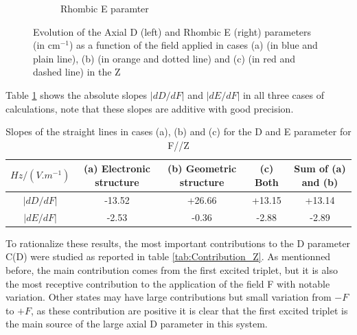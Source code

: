 \documentclass[10pt]{report}
\numberwithin{equation}{section}
\begin{document}
\begin{figure}[!h]
\begin{subfigure}{.5\textwidth}
      \caption{Rhombic E paramter}
      \label{fig:Ni_E_Z}
    \end{subfigure}
    \caption{Evolution of the Axial D (left) and Rhombic E (right) parameters (in cm$^{-1}$) as a function of the field applied in cases (a) (in blue and plain line), (b)
    (in orange and dotted line) and (c) (in red and dashed line) in the Z}
    \label{fig:ParamNi_E_Z}
\end{figure}

Table \ref{Slope_D_Z} shows the absolute slopes $|dD/dF|$ and $|dE/dF|$ in all three cases of calculations, note that these slopes are additive with good precision.

\begin{table}[!h]
    \begin{tabular}{c | c c c c}
        \hline
        $Hz/(V.m^{-1})$ &  (a) Electronic structure & (b) Geometric structure & (c) Both & Sum of (a) and (b)\\
        \hline
        $|dD/dF|$ & -13.52	& +26.66& 	+13.15 & 	+13.14\\
        $|dE/dF|$ &-2.53& 	-0.36& 	-2.88& 	-2.89\\
    \end{tabular}
    \caption{Slopes of the straight lines in cases (a), (b) and (c) for the D and E parameter for F//Z}
    \label{Slope_D_Z}
\end{table}

To rationalize these results, the most important contributions to the D parameter C(D) were studied as reported in table \ref{tab:Contribution_Z}.
As mentionned before, the main contribution comes from the first excited triplet, but it is also the most receptive contribution to the application of the field F with notable variation.
Other states may have large contributions but small variation from $-F$ to $+F$, as these contribution are positive it is clear that the first excited triplet is the main source of the large axial D parameter in this system.
\end{document}
